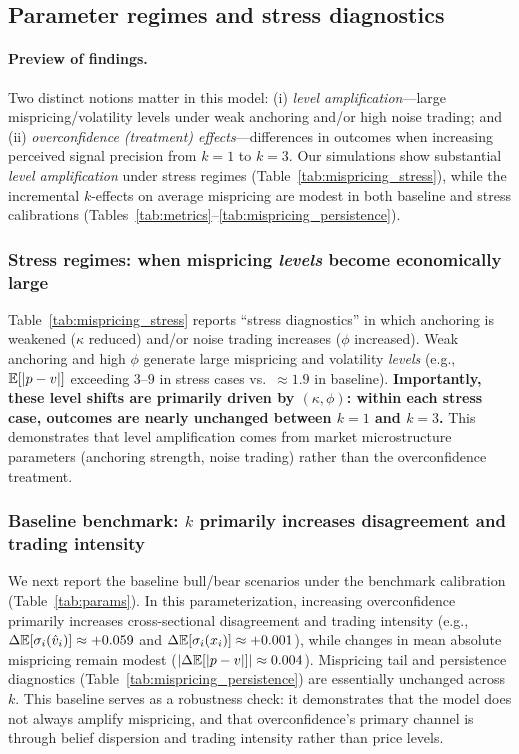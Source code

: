 

\subsection{Parameter regimes and stress diagnostics}
\label{sec:meaningful_regions}

\paragraph{Preview of findings.}
Two distinct notions matter in this model:
(i) \emph{level amplification}---large mispricing/volatility levels under weak anchoring and/or high noise trading; and
(ii) \emph{overconfidence (treatment) effects}---differences in outcomes when increasing perceived signal precision from $k=1$ to $k=3$.
Our simulations show substantial \emph{level amplification} under stress regimes (Table~\ref{tab:mispricing_stress}), while the incremental
$k$-effects on average mispricing are modest in both baseline and stress calibrations (Tables~\ref{tab:metrics}--\ref{tab:mispricing_persistence}).

\subsubsection{Stress regimes: when mispricing \emph{levels} become economically large}
\label{subsec:stress}
Table~\ref{tab:mispricing_stress} reports ``stress diagnostics'' in which anchoring is weakened ($\kappa$ reduced) and/or noise trading increases ($\phi$ increased).
Weak anchoring and high $\phi$ generate large mispricing and volatility \emph{levels} (e.g., $\mathbb{E}[|p-v|]$ exceeding $3$--$9$ in stress cases vs.\ $\approx 1.9$ in baseline).
\textbf{Importantly, these level shifts are primarily driven by $(\kappa,\phi)$: within each stress case, outcomes are nearly unchanged between $k=1$ and $k=3$.}
This demonstrates that level amplification comes from market microstructure parameters (anchoring strength, noise trading) rather than the overconfidence treatment.

\subsubsection{Baseline benchmark: \texorpdfstring{$k$}{k} primarily increases disagreement and trading intensity}
\label{subsec:baseline_benchmark}
We next report the baseline bull/bear scenarios under the benchmark calibration (Table~\ref{tab:params}).
In this parameterization, increasing overconfidence primarily increases cross-sectional disagreement and trading intensity
(e.g., $\Delta \mathbb{E}[\sigma_i(\hat v_i)] \approx +0.059$ and $\Delta \mathbb{E}[\sigma_i(x_i)] \approx +0.001$), while changes in mean absolute mispricing remain modest ($|\Delta \mathbb{E}[|p-v|]| \approx 0.004$).
Mispricing tail and persistence diagnostics (Table~\ref{tab:mispricing_persistence}) are essentially unchanged across $k$.
This baseline serves as a robustness check: it demonstrates that the model does not always amplify mispricing, and that overconfidence's primary channel is through belief dispersion and trading intensity rather than price levels.

